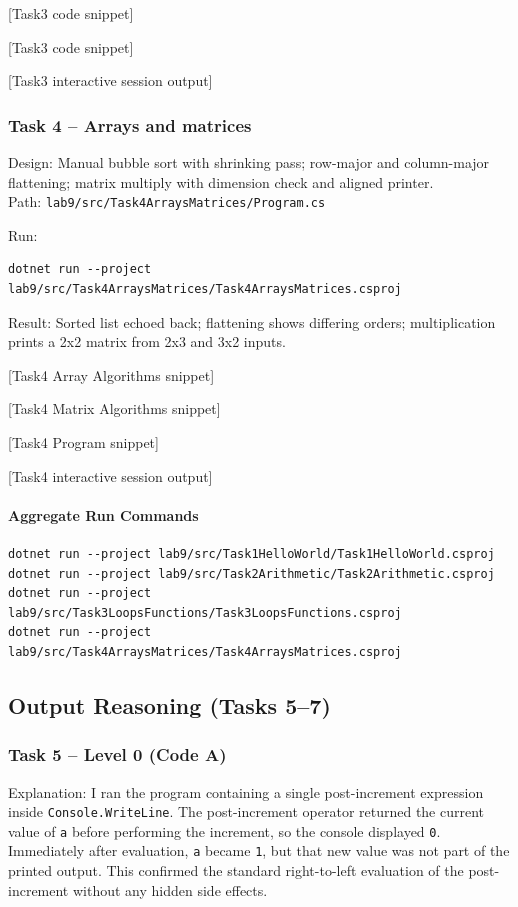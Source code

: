 [Task3 code snippet]

[Task3 code snippet]

[Task3 interactive session output]

\subsubsection{Task 4 -- Arrays and matrices}
Design: Manual bubble sort with shrinking pass; row-major and column-major flattening; matrix multiply with dimension check and aligned printer.\\
Path: \texttt{lab9/src/Task4ArraysMatrices/Program.cs}

Run:
\begin{verbatim}
dotnet run --project lab9/src/Task4ArraysMatrices/Task4ArraysMatrices.csproj
\end{verbatim}

Result: Sorted list echoed back; flattening shows differing orders; multiplication prints a 2x2 matrix from 2x3 and 3x2 inputs.

[Task4 Array Algorithms snippet]

[Task4 Matrix Algorithms snippet]

[Task4 Program snippet]

[Task4 interactive session output]

\paragraph{Aggregate Run Commands}
\begin{verbatim}
dotnet run --project lab9/src/Task1HelloWorld/Task1HelloWorld.csproj
dotnet run --project lab9/src/Task2Arithmetic/Task2Arithmetic.csproj
dotnet run --project lab9/src/Task3LoopsFunctions/Task3LoopsFunctions.csproj
dotnet run --project lab9/src/Task4ArraysMatrices/Task4ArraysMatrices.csproj
\end{verbatim}

\subsection{Output Reasoning (Tasks 5--7)}

\subsubsection{Task 5 -- Level 0 (Code A)}
Explanation: I ran the program containing a single post-increment expression inside \texttt{Console.WriteLine}. The post-increment operator returned the current value of \texttt{a} before performing the increment, so the console displayed \texttt{0}. Immediately after evaluation, \texttt{a} became \texttt{1}, but that new value was not part of the printed output. This confirmed the standard right-to-left evaluation of the post-increment without any hidden side effects.

